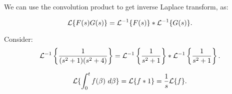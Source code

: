 \documentclass[../main/main.tex]{subfiles}
\begin{document}
We can use the convolution product to get inverse Laplace transform, as: 
\begin{theorem}
	 \[
		 \mathcal{L} \{F(s)G(s)\} = \mathcal{L}^{-1} \{F(s)\} *\mathcal{L} ^{-1} \{G(s)\} 
	.\] 
\end{theorem}
\begin{example}
	Consider: \[
		\mathcal{L}^{-1} \left\{ \frac{1}{(s^2+1)(s^2+4)}\right\} = \mathcal{L}^{-1} \left\{\frac{1}{s^2+1}\right\} * \mathcal{L} ^{-1} \left\{\frac{1}{s^2+1}\right\} 
	.\] 
\end{example}
\begin{remark}
	\[
		\mathcal{L} \{\int^t_0 f(\beta)~d\beta\} = \mathcal{L} \{f*1\} = \frac{1}{s}\mathcal{L} \{f\}  
	.\] 
\end{remark}
\end{document}
